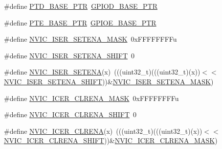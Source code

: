 \begin{DoxyCompactItemize}
\item 
\#define \hyperlink{group___backward___compatibility___symbols_gaa61d2c33375f3becbae1353eee4c1317}{P\+T\+D\+\_\+\+B\+A\+S\+E\+\_\+\+P\+TR}~\hyperlink{group___g_p_i_o___peripheral_ga080871bcecac6697912c87d4af0a8298}{G\+P\+I\+O\+D\+\_\+\+B\+A\+S\+E\+\_\+\+P\+TR}
\item 
\#define \hyperlink{group___backward___compatibility___symbols_gaa230685f72ad1540850ab8d12366775c}{P\+T\+E\+\_\+\+B\+A\+S\+E\+\_\+\+P\+TR}~\hyperlink{group___g_p_i_o___peripheral_ga5d17758f0829d938753761d4a53c0a7c}{G\+P\+I\+O\+E\+\_\+\+B\+A\+S\+E\+\_\+\+P\+TR}
\item 
\#define \hyperlink{group___backward___compatibility___symbols_ga7e67471c208e3986c0cdd8e7e1319a30}{N\+V\+I\+C\+\_\+\+I\+S\+E\+R\+\_\+\+S\+E\+T\+E\+N\+A\+\_\+\+M\+A\+SK}~0x\+F\+F\+F\+F\+F\+F\+F\+Fu
\item 
\#define \hyperlink{group___backward___compatibility___symbols_ga9965b5df5f4c6c8d3a1c8e89d03d9489}{N\+V\+I\+C\+\_\+\+I\+S\+E\+R\+\_\+\+S\+E\+T\+E\+N\+A\+\_\+\+S\+H\+I\+FT}~0
\item 
\#define \hyperlink{group___backward___compatibility___symbols_ga8ab1a05215cc61b33eac1d6c4b00b704}{N\+V\+I\+C\+\_\+\+I\+S\+E\+R\+\_\+\+S\+E\+T\+E\+NA}(x)~(((uint32\+\_\+t)(((uint32\+\_\+t)(x))$<$$<$\hyperlink{group___backward___compatibility___symbols_ga9965b5df5f4c6c8d3a1c8e89d03d9489}{N\+V\+I\+C\+\_\+\+I\+S\+E\+R\+\_\+\+S\+E\+T\+E\+N\+A\+\_\+\+S\+H\+I\+FT}))\&\hyperlink{group___backward___compatibility___symbols_ga7e67471c208e3986c0cdd8e7e1319a30}{N\+V\+I\+C\+\_\+\+I\+S\+E\+R\+\_\+\+S\+E\+T\+E\+N\+A\+\_\+\+M\+A\+SK})
\item 
\#define \hyperlink{group___backward___compatibility___symbols_gad8da511197e454095edbfeb501e8b2f5}{N\+V\+I\+C\+\_\+\+I\+C\+E\+R\+\_\+\+C\+L\+R\+E\+N\+A\+\_\+\+M\+A\+SK}~0x\+F\+F\+F\+F\+F\+F\+F\+Fu
\item 
\#define \hyperlink{group___backward___compatibility___symbols_ga35b241c6ab2dbf18cf15503076dcb9a8}{N\+V\+I\+C\+\_\+\+I\+C\+E\+R\+\_\+\+C\+L\+R\+E\+N\+A\+\_\+\+S\+H\+I\+FT}~0
\item 
\#define \hyperlink{group___backward___compatibility___symbols_ga4b746f45cbda253f31cdf619a8ae2707}{N\+V\+I\+C\+\_\+\+I\+C\+E\+R\+\_\+\+C\+L\+R\+E\+NA}(x)~(((uint32\+\_\+t)(((uint32\+\_\+t)(x))$<$$<$\hyperlink{group___backward___compatibility___symbols_ga35b241c6ab2dbf18cf15503076dcb9a8}{N\+V\+I\+C\+\_\+\+I\+C\+E\+R\+\_\+\+C\+L\+R\+E\+N\+A\+\_\+\+S\+H\+I\+FT}))\&\hyperlink{group___backward___compatibility___symbols_gad8da511197e454095edbfeb501e8b2f5}{N\+V\+I\+C\+\_\+\+I\+C\+E\+R\+\_\+\+C\+L\+R\+E\+N\+A\+\_\+\+M\+A\+SK})

\end{DoxyCompactItemize}
